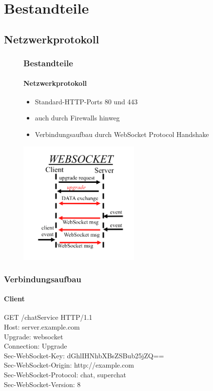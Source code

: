\documentclass{beamer}
\begin{document}
\section{Bestandteile}

\subsection{Netzwerkprotokoll}
\begin{frame}
\begin{figure}[htbp]
\frametitle{Bestandteile}
\framesubtitle{Netzwerkprotokoll}
\begin{minipage}[t]{5cm}
\vspace{0pt}
\begin{itemize}
\item Standard-HTTP-Ports 80 und 443
\item auch durch Firewalls hinweg
\item Verbindungsaufbau durch WebSocket Protocol Handshake
\end{itemize}
\end{minipage}
\hfill
\begin{minipage}[t]{6cm}
\vspace{0pt}
\includegraphics[width=6cm]{WebSocket.png}
\end{minipage}
\end{figure}
\end{frame}

\begin{frame}
\frametitle{Verbindungsaufbau}
\framesubtitle{Client}
GET /chatService HTTP/1.1\\
Host: server.example.com\\
Upgrade: websocket\\
Connection: Upgrade\\
Sec-WebSocket-Key: dGhlIHNhbXBsZSBub25jZQ==\\
Sec-WebSocket-Origin: http://example.com\\
Sec-WebSocket-Protocol: chat, superchat\\
Sec-WebSocket-Version: 8 \\
\end{frame}
\end{document}
